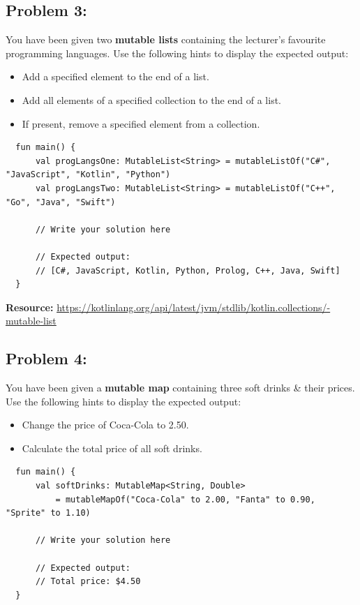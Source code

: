\documentclass{article}
\begin{document}
\subsection*{Problem 3:} You have been given two \textbf{mutable lists} containing the lecturer's favourite programming languages. Use the following hints to display the expected output:
\begin{itemize}
  \item Add a specified element to the end of a list.
  \item Add all elements of a specified collection to the end of a list.
  \item If present, remove a specified element from a collection.
\end{itemize}

\begin{verbatim}
  fun main() {
      val progLangsOne: MutableList<String> = mutableListOf("C#", "JavaScript", "Kotlin", "Python")
      val progLangsTwo: MutableList<String> = mutableListOf("C++", "Go", "Java", "Swift")
    
      // Write your solution here
    
      // Expected output:
      // [C#, JavaScript, Kotlin, Python, Prolog, C++, Java, Swift]
  }
\end{verbatim}

\textbf{Resource:} \href{https://kotlinlang.org/api/latest/jvm/stdlib/kotlin.collections/-mutable-list}{https://kotlinlang.org/api/latest/jvm/stdlib/kotlin.collections/-mutable-list}

\subsection*{Problem 4:} You have been given a \textbf{mutable map} containing three soft drinks \& their prices. Use the following hints to display the expected output:
\begin{itemize}
  \item Change the price of Coca-Cola to 2.50.
  \item Calculate the total price of all soft drinks.
\end{itemize}

\begin{verbatim}
  fun main() {
      val softDrinks: MutableMap<String, Double> 
          = mutableMapOf("Coca-Cola" to 2.00, "Fanta" to 0.90, "Sprite" to 1.10)

      // Write your solution here

      // Expected output:
      // Total price: $4.50
  }
\end{verbatim}
\end{document}
